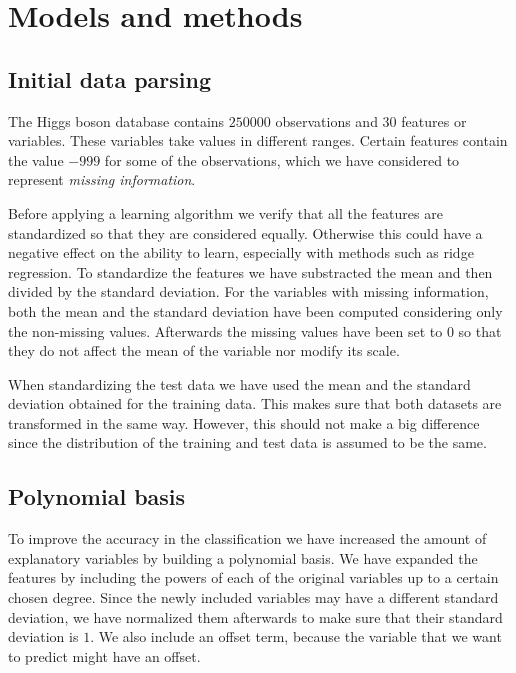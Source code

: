 \documentclass[10pt,conference,compsocconf]{IEEEtran}
\begin{document}
\section{Models and methods}
	\label{sec:models-methods}
	\subsection{Initial data parsing} %
	\label{sub:initial_data_parsing}
  	The Higgs boson database contains $250000$ observations and $30$ features or variables. These variables take values in different ranges. Certain features contain the value $-999$ for some of the observations, which we have considered to represent \emph{missing information}. %

  	Before applying a learning algorithm we verify that all the features are standardized so that they are considered equally. Otherwise this could have a negative effect on the ability to learn, especially with methods such as ridge regression. To standardize the features we have substracted the mean and then divided by the standard deviation. For the variables with missing information, both the mean and the standard deviation have been computed considering only the non-missing values. Afterwards the missing values have been set to $0$ so that they do not affect the mean of the variable nor modify its scale.

  	When standardizing the test data we have used the mean and the standard deviation obtained for the training data. This makes sure that both datasets are transformed in the same way. However, this should not make a big difference since the distribution of the training and test data is assumed to be the same.

	\subsection{Polynomial basis} %
	\label{sub:polynomial_basis}
  	To improve the accuracy in the classification we have increased the amount of explanatory variables by building a polynomial basis. We have expanded the features by including the powers of each of the original variables up to a certain chosen degree. Since the newly included variables may have a different standard deviation, we have normalized them afterwards to make sure that their standard deviation is $1$. We also include an offset term, because the variable that we want to predict might have an offset.
\end{document}
